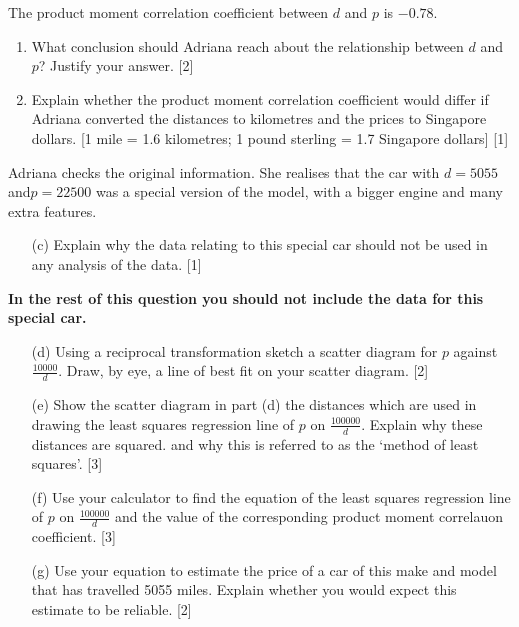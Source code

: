 The product moment correlation coefficient between $d$ and $p$ is
$-0.78$. 
\begin{enumerate}
\item What conclusion should Adriana reach about the relationship between
$d$ and $p$? Justify your answer. \hfill{}{[}2{]}
\item Explain whether the product moment correlation coefficient would differ
if Adriana converted the distances to kilometres and the prices to
Singapore dollars. {[}1 mile = 1.6 kilometres; 1 pound sterling =
1.7 Singapore dollars{]}\hfill{} {[}1{]}
\end{enumerate}
Adriana \textquotedbl checks the original information. She realises
that the car with $d=5055$ and$p=22500$ was a special version of
the model, with a bigger engine and many extra features.
\begin{enumerate}
\item[(c)]  Explain why the data relating to this special car should not be
used in any analysis of the data. \hfill{}{[}1{]}
\end{enumerate}
\textbf{In the rest of this question you should not include the data
for this special car.}
\begin{enumerate}
\item[(d)]  Using a reciprocal transformation sketch a scatter diagram for $p$
against $\frac{10000}{d}$. Draw, by eye, a line of best fit on your
scatter diagram.\hfill{} {[}2{]}
\item[(e)]  Show the scatter diagram in part (d) the distances which are used
in drawing the least squares regression line of $p$ on $\frac{100000}{d}$.
Explain why these distances are squared. and why this is referred
to as the \textquoteleft method of least squares'. \hfill{}{[}3{]}
\item[(f)]  Use your calculator to find the equation of the least squares regression
line of $p$ on $\frac{100000}{d}$ and the value of the corresponding
product moment correlauon coefficient. \hfill{}{[}3{]}
\item[(g)]  Use your equation to estimate the price of a car of this make and
model that has travelled 5055 miles. Explain whether you would expect
this estimate to be reliable. \hfill{}{[}2{]}
\end{enumerate}
